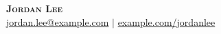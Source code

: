 \documentclass[letterpaper,11pt]{article}
\begin{document}
\begin{center}
    \textbf{\Huge \scshape Jordan Lee} \\ \vspace{1pt}
    \small \href{mailto:jordan.lee@example.com}{jordan.lee@example.com} $|$
    \href{https://example.com/jordanlee}{example.com/jordanlee}
\end{center}




\end{document}
